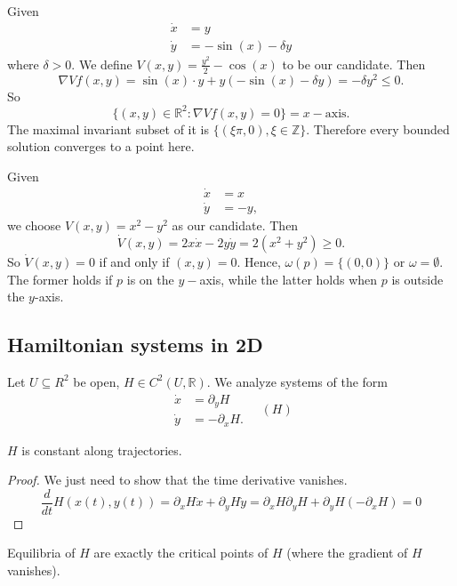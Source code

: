 \documentclass{article}
\newcommand*{\Z}{\mathbb{Z}}
\newcommand*{\R}{\mathbb{R}}
\newcommand*{\half}[1]{\frac{#1}{2}}
\begin{document}
\begin{exam}
    Given
    $$\begin{aligned}
        \dot x &= y\\
        \dot y &= -\sin(x)-\delta y
    \end{aligned}$$
    where $\delta > 0$. We define $V(x,y) = \half {y^2}-\cos(x)$ to be our candidate. Then
    $$\nabla Vf(x,y) = \sin(x)\cdot y + y(-\sin(x)-\delta y)=-\delta y^2 \leq 0.$$
    So
    $$\{(x,y)\in\R^2:\nabla Vf(x,y)=0\} = x-\text{axis}.$$
    The maximal invariant subset of it is $\{(\xi \pi,0), \xi \in \Z\}$. Therefore every bounded solution converges to a point here.
\end{exam}

\begin{exam}
    Given
    $$\begin{aligned}
        \dot x&= x\\
        \dot y &= -y,
    \end{aligned}$$
    we choose $V(x,y) = x^2-y^2$ as our candidate. Then
    $$\dot V(x,y) = 2x\dot x-2y\dot y = 2(x^2+y^2) \geq 0.$$ So $\dot V(x,y) = 0$ if and only if $(x,y)=0$. Hence, $\omega(p) = \{(0,0)\}$ or $\omega = \emptyset$. The former holds if $p$ is on the $y-$axis, while the latter holds when $p$ is outside the $y$-axis.
\end{exam}

\subsection{Hamiltonian systems in 2D}

Let $U \subseteq R^2$ be open, $H \in C^2(U, \R)$. We analyze systems of the form
$$\begin{aligned}
    \dot x &= \partial_y H\\
    \dot y &= -\partial_x H.
\end{aligned}\quad (H)$$

\begin{thm}
    $H$ is constant along trajectories.
\end{thm}

\begin{proof}
    We just need to show that the time derivative vanishes.
    $$\frac{d}{dt} H(x(t),y(t)) = \partial_x H\dot x +\partial_y H \dot y = \partial_x H \partial_y H +\partial_y H (-\partial_x H)=0$$
\end{proof}

\begin{rem}
    Equilibria of $H$ are exactly the critical points of $H$ (where the gradient of $H$ vanishes).
\end{rem}
\end{document}
